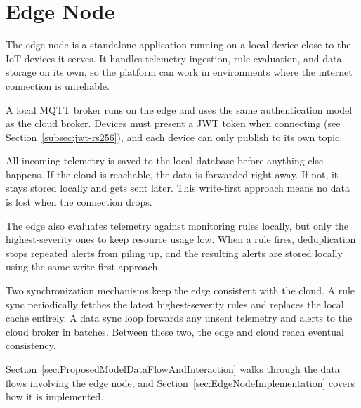 
\section{Edge Node}
\label{sec:EdgeNode}

The edge node is a standalone application running on a local device close to the \gls{IoT} devices it serves. It handles telemetry ingestion, rule evaluation, and data storage on its own, so the platform can work in environments where the internet connection is unreliable.

A local \gls{MQTT} broker runs on the edge and uses the same authentication model as the cloud broker. Devices must present a \gls{JWT} token when connecting (see Section~\ref{subsec:jwt-rs256}), and each device can only publish to its own topic.

All incoming telemetry is saved to the local database before anything else happens. If the cloud is reachable, the data is forwarded right away. If not, it stays stored locally and gets sent later. This write-first approach means no data is lost when the connection drops.

The edge also evaluates telemetry against monitoring rules locally, but only the highest-severity ones to keep resource usage low. When a rule fires, deduplication stops repeated alerts from piling up, and the resulting alerts are stored locally using the same write-first approach.

Two synchronization mechanisms keep the edge consistent with the cloud. A rule sync periodically fetches the latest highest-severity rules and replaces the local cache entirely. A data sync loop forwards any unsent telemetry and alerts to the cloud broker in batches. Between these two, the edge and cloud reach eventual consistency.

Section~\ref{sec:ProposedModelDataFlowAndInteraction} walks through the data flows involving the edge node, and Section~\ref{sec:EdgeNodeImplementation} covers how it is implemented.

